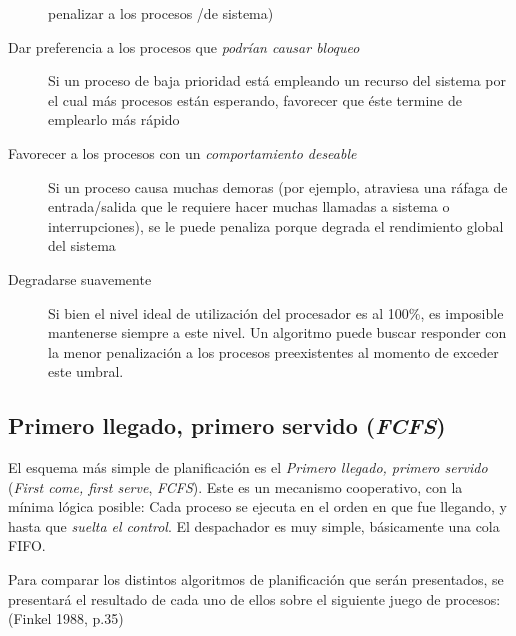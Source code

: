 \documentclass[11pt,fleqn]{book} %
\begin{document}
\begin{description}
     penalizar a los procesos /de sistema)
\item[Dar preferencia a los procesos que \emph{podrían causar bloqueo}] Si
     un proceso de baja prioridad está empleando un recurso del
     sistema por el cual más procesos están esperando, favorecer que
     éste termine de emplearlo más rápido
\item[Favorecer a los procesos con un \emph{comportamiento deseable}] Si un
     proceso causa muchas demoras (por ejemplo, atraviesa una ráfaga
     de entrada/salida que le requiere hacer muchas llamadas a
     sistema o interrupciones), se le puede penaliza porque degrada
     el rendimiento global del sistema
\item[Degradarse suavemente] Si bien el nivel ideal de utilización del
     procesador es al 100\%, es imposible mantenerse siempre a este
     nivel. Un algoritmo puede buscar responder con la menor
     penalización a los procesos preexistentes al momento de exceder
     este umbral.
\end{description}
\subsection{Primero llegado, primero servido (\emph{FCFS})}
\label{sec-4-2-2}


El esquema más simple de planificación es el \emph{Primero llegado, primero servido} (\emph{First come, first serve}, \emph{FCFS}). Este es un mecanismo
cooperativo, con la mínima lógica posible: Cada proceso se ejecuta en
el orden en que fue llegando, y hasta que \emph{suelta el control}. El
despachador es muy simple, básicamente una cola FIFO.

Para comparar los distintos algoritmos de planificación que serán
presentados, se presentará el resultado de cada uno de ellos sobre el
siguiente juego de procesos: (Finkel 1988, p.35)
\end{document}

